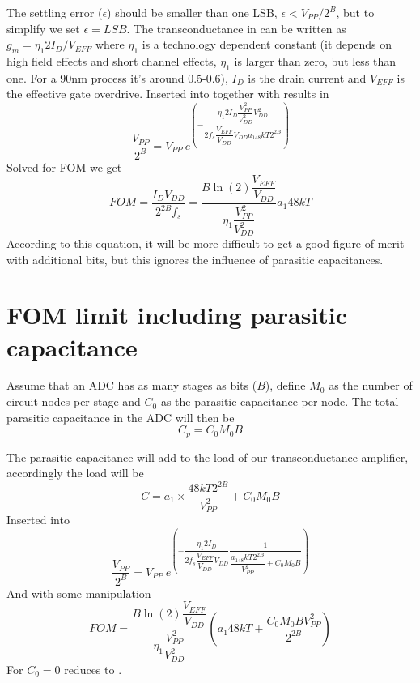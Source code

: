 The settling error ($\epsilon$) should be smaller than one LSB,
$\epsilon < V_{PP}/2^B$, but to simplify we set $\epsilon = LSB$. The transconductance in  can be written as $g_m =
  \eta_1 2 I_D/V_{EFF}$  where $\eta_1$ is a technology dependent
  constant (it depends on high field effects and short channel
  effects, $\eta_1$ is larger than zero, but less than one. For a 90nm
  process it's around 0.5-0.6), $I_D$ is the
  drain current and $V_{EFF}$ is the effective gate
  overdrive. Inserted into  together with  results in
\begin{equation}
\dfrac{V_{PP}}{2^B} =V_{PP} \: e^{\left(-\dfrac{\eta_1 2 I_D
    \dfrac{V_{PP}^2}{V_{DD}^2}V_{DD}^2}{2f_s\dfrac{V_{EFF}}{V_{DD}}V_{DD}a_148kT2^{2B}}\right)}
\end{equation}
Solved for FOM we get
\begin{equation}
\label{eq:settling}
FOM = \dfrac{I_DV_{DD}}{2^{2B}f_s} = \dfrac{ B \ln(2)
  \dfrac{V_{EFF}}{V_{DD}}}{\eta_1 \dfrac{V_{PP}^2}{V_{DD}^2}} a_1 48kT
\end{equation}
According to this equation, it will be more difficult to
get a good figure of merit  with additional bits, but this ignores the influence
of parasitic capacitances.

\section{FOM limit including parasitic capacitance}
Assume that an ADC has as many stages as bits ($B$), define $M_0$ as
the number of circuit nodes per
stage and $C_0$ as the parasitic capacitance per node. The total
parasitic capacitance in the ADC will then be
\begin{equation}
\label{eq:cap_p}
C_p = C_0 M_0 B  
\end{equation} 

The parasitic capacitance  will add to the load of our
transconductance amplifier, accordingly the load will be
\begin{equation}
\label{eq:parcap}
C = a_1 \times \dfrac{48 k T 2^{2B}}{V_{PP}^2} + C_0 M_0 B
\end{equation}
Inserted into  %
\begin{equation}
\dfrac{V_{PP}}{2^B} =V_{PP} \:e^{\left(-\dfrac{\eta_1 2
    I_D}{2f_s\dfrac{V_{EFF}}{V_{DD}}V_{DD}}\dfrac{1}{\dfrac{a_148kT2^{2B}}{V_{PP}^2}+
  C_0 M_0 B}\right)}
\end{equation}
And with some manipulation
\begin{equation}
\label{eq:parfom}
FOM = \dfrac{B \ln(2) \dfrac{V_{EFF}}{V_{DD}}}{\eta_1
  \dfrac{V_{PP}^2}{V_{DD}^2}}\left( a_1 48 kT + \dfrac{C_0 M_0 B
    V_{PP}^2}{2^{2B}}\right)
\end{equation}
For $C_0 = 0$  reduces to . 

